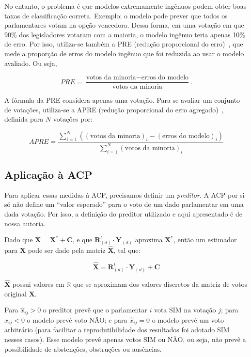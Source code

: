 \documentclass[
	article,			%
	12pt,				%
	oneside,			%
	a4paper,			%
	english,			%
	brazil,				%
	sumario=tradicional,
	oldfontcommands %
	]{abntex2}
\newcommand\nay{NÃO\xspace}
\newcommand\yea{SIM\xspace}
\begin{document}
No entanto, o problema é que modelos extremamente ingênuos podem obter boas taxas de classificação correta. Exemplo: o modelo pode prever que todos os parlamentares votam na opção vencedora. Dessa forma, em uma votação em que 90\% dos legisladores votaram com a maioria, o modelo ingênuo teria apenas 10\% de erro. Por isso, utiliza-se também a PRE (redução proporcional do erro)~\cite{leoni02cdep}, que mede a proporção de erros do modelo ingênuo que foi reduzida ao usar o modelo avaliado. Ou seja,

\[PRE = \frac{\textrm{votos da minoria} - \textrm{erros do modelo}}{\textrm{votos da minoria}}.\]

A fórmula da PRE considera apenas uma votação. Para se avaliar um conjunto de votações, utiliza-se a APRE (redução proporcional do erro agregado)~\cite{leoni02cdep}, definida para $N$ votações por:

\[APRE = \frac{\sum_{i=1}^{N}\left(\left(\textrm{votos da minoria}\right)_i-\left(\textrm{erros do modelo}\right)_i\right)}{\sum_{i=1}^{N}\left(\textrm{votos da minoria}\right)_i}\]

\subsection{Aplicação à ACP}
\label{sec:avaliacao_acp}

Para aplicar essas medidas à ACP, precisamos definir um \emph{preditor}. A ACP por si só não define um ``valor esperado'' para o voto de um dado parlamentar em uma dada votação. Por isso, a definição do preditor utilizado e aqui apresentado é de nossa autoria.

Dado que $\mathbf{X = X^* + C}$, e que $\mathbf{R}_{(d)}^{t}\cdot \mathbf{Y}_{(d)}$ aproxima $\mathbf{X^*}$, então um estimador para $\mathbf{X}$ pode ser dado pela matriz $\mathbf{\widehat{X}}$, tal que:

\begin{equation}
  \widehat{\mathbf{X}} = \mathbf{R}_{(d)}^{t} \cdot \mathbf{Y}_{(d)} + \mathbf{C}
\end{equation}

$\widehat{\mathbf{X}}$ possui valores em $\mathbb{R}$ que se aproximam dos valores discretos da matriz de votos original $\mathbf{X}$.

Para $\widehat{x}_{ij} > 0$ o preditor prevê que o parlamentar $i$ vota \yea na votação $j$; para $\widehat{x}_{ij} < 0$ o modelo prevê voto \nay; e para $\widehat{x}_{ij} = 0$ o modelo prevê um voto arbitrário (para facilitar a reprodutibilidade dos resultados foi adotado \yea nesses casos). Esse modelo prevê apenas votos \yea ou \nay, ou seja, não prevê a possibilidade de abstenções, obstruções ou ausências.
\end{document}
